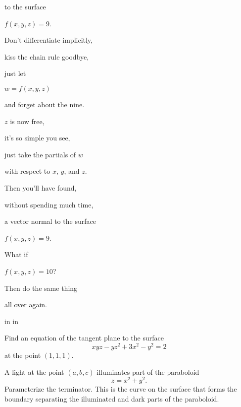 \documentclass{ximera}
\newcommand{\pskip}{\vskip 0.1 in}
\begin{document}
to the surface

$f(x,y,z)=9$.

Don't differentiate implicitly,

kiss the chain rule goodbye,

just let 

$w=f(x,y,z)$

and forget about the nine.

$z$ is now free,

it's so simple you see,

just take the partials of $w$

with respect to $x$, $y$, and $z$.

Then you'll have found,

without spending much time,

a vector normal to the surface

$f(x,y,z) = 9$.

What if 

$f(x,y,z) = 10$?

Then do the same thing

all over again.


\pskip\pskip

\begin{question} \label{Qdfbtt44}
Find an equation of the tangent plane to the surface
\[
    xyz - yz^2 +3x^2 -y^2 = 2
\]
at the point $(1,1,1)$.
\end{question}


\begin{question}  \label{Qweregtt5}
A light at the point $(a,b,c)$ illuminates part of the paraboloid
\[
   z = x^2 + y^2.
\]
Parameterize the terminator. This is the curve on the surface that forms the boundary separating the illuminated and dark parts of the paraboloid. 

\end{question}
\end{document}
